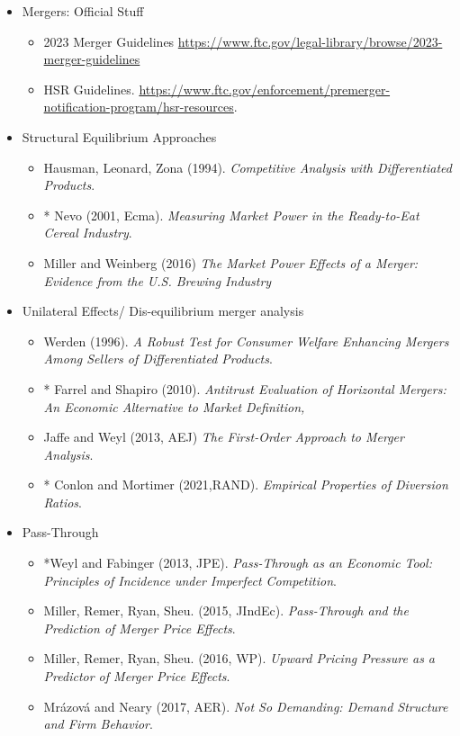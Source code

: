 \documentclass[11pt]{article}
\begin{document}
\begin{itemize}
\item Mergers: Official Stuff
\begin{itemize}
\item 2023 Merger Guidelines \url{https://www.ftc.gov/legal-library/browse/2023-merger-guidelines}
\item HSR Guidelines. \url{https://www.ftc.gov/enforcement/premerger-notification-program/hsr-resources}.
\end{itemize}
\item Structural Equilibrium Approaches
\begin{itemize}
\item Hausman, Leonard, Zona (1994). \textit{Competitive Analysis with Differentiated Products}.
\item * Nevo (2001, Ecma). \textit{Measuring Market Power in the Ready-to-Eat Cereal Industry}.
\item Miller and Weinberg (2016) \textit{The Market Power Effects of a Merger: Evidence from the U.S. Brewing Industry}
\end{itemize}
\item Unilateral Effects/ Dis-equilibrium merger analysis
\begin{itemize}
\item Werden (1996). \textit{A Robust Test for Consumer Welfare Enhancing
Mergers Among Sellers of Differentiated Products}.
\item * Farrel and Shapiro (2010). \textit{Antitrust Evaluation of Horizontal Mergers: An Economic Alternative to Market Definition,}
\item Jaffe and Weyl (2013, AEJ) \textit{The First-Order Approach to Merger Analysis}.
\item * Conlon and Mortimer (2021,RAND). \textit{Empirical Properties of Diversion Ratios}.
\end{itemize}
\item Pass-Through
\begin{itemize}
\item *Weyl and Fabinger (2013, JPE). \textit{Pass-Through as an Economic Tool: Principles of Incidence under Imperfect Competition}.
\item Miller, Remer, Ryan, Sheu. (2015, JIndEc). \textit{Pass-Through and the Prediction of Merger Price Effects}.
\item Miller, Remer, Ryan, Sheu. (2016, WP). \textit{Upward Pricing Pressure as a Predictor of Merger Price Effects}.
\item Mr\'azov\'a and Neary (2017, AER). \textit{Not So Demanding: Demand Structure and Firm Behavior}.

\end{itemize}
\end{itemize}
\end{document}
